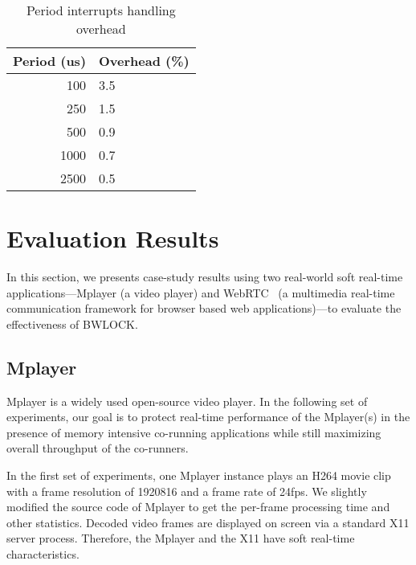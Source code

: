 \documentclass[times, 10pt,onecolumn]{article}
\newcommand{\bottomrule}{\hline}
\newcommand{\toprule}{\hline}
\newcommand{\midrule}{\hline}
\begin{document}
\begin{table}
\centering
\begin{tabular}{rl}
\toprule
Period (us) & Overhead (\%) \\
\midrule
100 & 3.5 \\
250 & 1.5 \\
500 & 0.9 \\
1000 & 0.7 \\
2500 & 0.5 \\
\bottomrule
\end{tabular}
\caption{Period interrupts handling overhead}
\label{tbl:overhead-period}
\end{table}

\section{Evaluation Results} \label{sec:casestudy}

In this section, we presents case-study results using two real-world
soft real-time applications---Mplayer (a video player) and
WebRTC~\cite{webrtc} (a multimedia real-time communication framework
for browser based web applications)---to evaluate the effectiveness
of BWLOCK.

\subsection{Mplayer}

Mplayer is a widely used open-source video player. In the following
set of experiments, our goal is to protect real-time performance of the
Mplayer(s) in the presence of memory intensive co-running applications
while still maximizing overall throughput of the co-runners.

In the first set of experiments, one Mplayer instance plays an H264
movie clip with a frame resolution of 1920816 and a frame rate
of 24fps. We slightly modified the source code of Mplayer to get the
per-frame processing time and other statistics.
Decoded video frames are displayed on screen via a standard
X11 server process. Therefore, the Mplayer and the X11 have soft
real-time characteristics.
\end{document}
